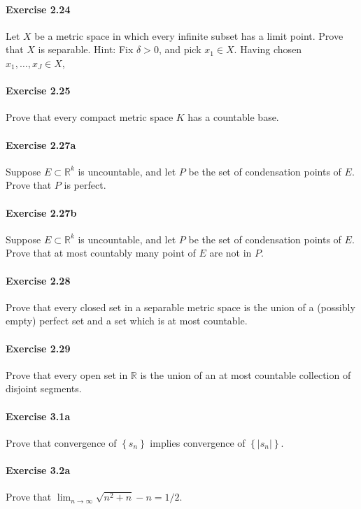 \documentclass{article}
\begin{document}
\paragraph{Exercise 2.24} Let $X$ be a metric space in which every infinite subset has a limit point. Prove that $X$ is separable. Hint: Fix $\delta>0$, and pick $x_{1} \in X$. Having chosen $x_{1}, \ldots, x_{J} \in X$,

\paragraph{Exercise 2.25} Prove that every compact metric space $K$ has a countable base.

\paragraph{Exercise 2.27a} Suppose $E\subset\mathbb{R}^k$ is uncountable, and let $P$ be the set of condensation points of $E$. Prove that $P$ is perfect.

\paragraph{Exercise 2.27b} Suppose $E\subset\mathbb{R}^k$ is uncountable, and let $P$ be the set of condensation points of $E$. Prove that at most countably many point of $E$ are not in $P$.

\paragraph{Exercise 2.28} Prove that every closed set in a separable metric space is the union of a (possibly empty) perfect set and a set which is at most countable.

\paragraph{Exercise 2.29} Prove that every open set in $\mathbb{R}$ is the union of an at most countable collection of disjoint segments.

\paragraph{Exercise 3.1a} Prove that convergence of $\left\{s_{n}\right\}$ implies convergence of $\left\{\left|s_{n}\right|\right\}$.

\paragraph{Exercise 3.2a} Prove that $\lim_{n \rightarrow \infty}\sqrt{n^2 + n} -n = 1/2$.
\end{document}
